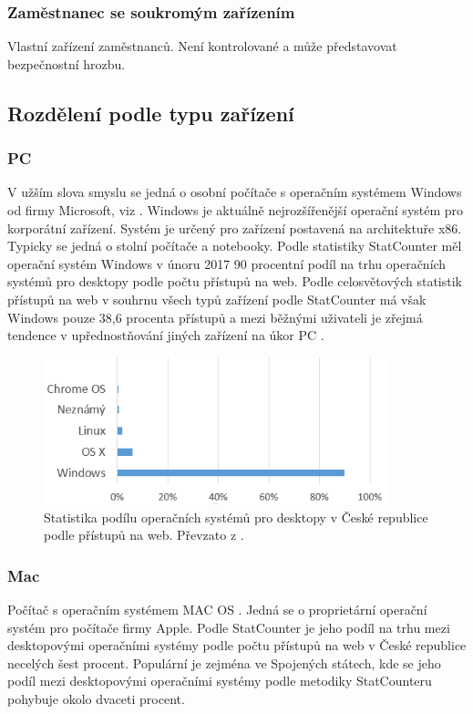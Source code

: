  \subsubsection{Zaměstnanec se soukromým zařízením}
 Vlastní zařízení zaměstnanců. Není kontrolované a může představovat bezpečnostní hrozbu.
 
 \subsection{Rozdělení podle typu zařízení}
 \subsubsection{PC}
 V užším slova smyslu se jedná o osobní počítače s operačním systémem Windows od firmy Microsoft, viz \cite{Intel_Mac_PC}. Windows je aktuálně nejrozšířenější operační systém pro korporátní zařízení. Systém je určený pro zařízení postavená na architektuře x86. Typicky se jedná o stolní počítače a notebooky. Podle statistiky StatCounter \cite{Statcounter1} měl operační systém Windows v únoru 2017 90 procentní podíl na trhu operačních systémů pro desktopy podle počtu přístupů na web. Podle celosvětových statistik přístupů na web v souhrnu všech typů zařízení podle StatCounter má však Windows pouze 38,6 procenta přístupů a mezi běžnými uživateli je zřejmá tendence v upřednostňování jiných zařízení na úkor PC \cite{HNAndroid}.
 
\begin{figure}[h!]
\centering
\includegraphics[width=10cm]{img/1_Desktopy_CZ}
\caption{Statistika podílu operačních systémů pro desktopy v České republice podle přístupů na web. Převzato z \cite{Statcounter1}.} 
\centering
\end{figure}
 
 
 
 \subsubsection{Mac}
 Počítač s operačním systémem MAC OS \cite{AppleMacOS}. Jedná se o proprietární operační systém pro počítače firmy Apple. Podle StatCounter je jeho podíl na trhu mezi desktopovými operačními systémy podle počtu přístupů na web v České republice necelých šest procent. Populární je zejména ve Spojených státech, kde se jeho podíl mezi desktopovými operačními systémy podle metodiky StatCounteru pohybuje okolo dvaceti procent.
 

